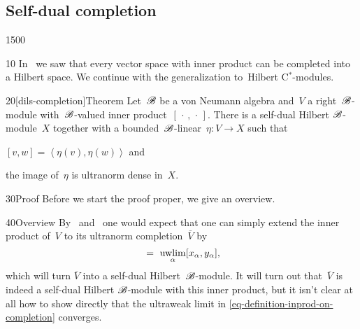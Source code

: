 \subsection{Self-dual completion}
\begin{parsec}{1500}%
\begin{point}{10}%
In~
    we saw that every vector space with inner product
    can be completed into a Hilbert space.
We continue with the generalization to~Hilbert C$^*$-modules.
\end{point}
\begin{point}{20}[dils-completion]{Theorem}%
Let~$\mathscr{B}$ be a von Neumann algebra
and~$V$ a right~$\mathscr{B}$-module with~$\mathscr{B}$-valued
    inner product~$[\,\cdot\,,\,\cdot\,]$.
There is a self-dual Hilbert $\mathscr{B}$-module~$X$
    together with a bounded~$\mathscr{B}$-linear~$\eta\colon V \to X$
    such that \begin{inparaenum}
    \item $[v,w] = \left<\eta (v),\eta(w)\right>$
    and \item the image of~$\eta$ is ultranorm dense in~$X$.
    \end{inparaenum}
\begin{point}{30}{Proof}%
Before we start the proof proper,
    we give an overview.
\begin{point}{40}{Overview}
By~ and~
    one would expect that
    one can simply extend the inner product of~$V$
    to its ultranorm completion~$\overline{V}$
    by
    \begin{equation}
        [(x_\alpha)_\alpha, (y_\alpha)_\alpha] \ =\  \uwlim_\alpha [x_\alpha,y_\alpha], \label{eq-definition-inprod-on-completion}
    \end{equation}
    which will turn $\overline{V}$ into a self-dual Hilbert~$\mathscr{B}$-module.
It will turn out that~$\overline{V}$
    is indeed a self-dual Hilbert $\mathscr{B}$-module
    with this inner product,
    but it isn't clear at all  how to show directly that the ultraweak limit
    in \eqref{eq-definition-inprod-on-completion} converges.


\end{point}
\end{point}
\end{point}
\end{parsec}
